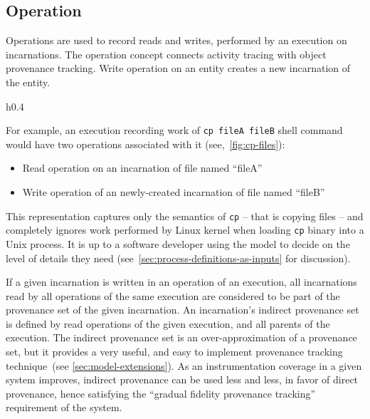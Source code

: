 \subsection{Operation}\label{sec:model-operation}

Operations are used to record reads and writes, performed by an execution on incarnations. The operation concept connects activity tracing with object provenance tracking. Write operation on an entity creates a new incarnation of the entity. 

\begin{wrapfigure}[8]{h}{0.4\textwidth}
\caption{\texttt{cp fileA fileB} representation in our model.}
\label{fig:cp-files}
\end{wrapfigure}

For example, an execution recording work of \texttt{cp fileA fileB} shell command would have two operations associated with it (see,~\cref{fig:cp-files}):
%
\begin{itemize}
	\item Read operation on an incarnation of file named ``fileA'' 
	\item Write operation of an newly-created incarnation of file named ``fileB'' 
\end{itemize}
%
This representation captures only the semantics of \texttt{cp} -- that is copying files -- and completely ignores work performed by Linux kernel when loading \texttt{cp} binary into a Unix process. It is up to a software developer using the model to decide on the level of details they need (see~\cref{sec:process-definitions-as-inputs} for discussion).

If a given incarnation is written in an operation of an execution, all incarnations read by all operations of the same execution are considered to be part of the provenance set of the given incarnation. An incarnation's indirect provenance set is defined by read operations of the given execution, and all parents of the execution. The indirect provenance set is an over-approximation of a provenance set, but it provides a very useful, and easy to implement provenance tracking technique~(see \cref{sec:model-extensions}). As an instrumentation coverage in a given system improves, indirect provenance can be used less and less, in favor of direct provenance, hence satisfying the ``gradual fidelity provenance tracking'' requirement of the system.

